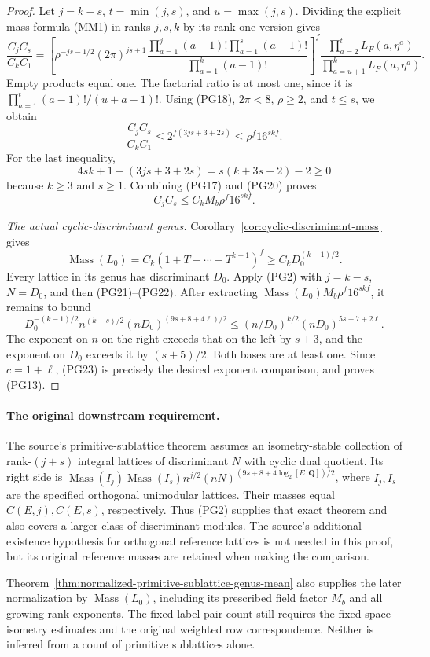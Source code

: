 \begin{proof}
Let \(j=k-s\), \(t=\min(j,s)\), and \(u=\max(j,s)\).
Dividing the explicit mass formula (MM1) in ranks \(j,s,k\)
by its rank-one version gives
\[
 \frac{C_jC_s}{C_k C_1}
 =
 \left[
  \rho^{-js-1/2}(2\pi)^{js+1}
  \frac{\prod_{a=1}^{j}(a-1)!\prod_{a=1}^{s}(a-1)!}
       {\prod_{a=1}^{k}(a-1)!}
 \right]^f
 \frac{\prod_{a=2}^{t}L_F(a,\eta^a)}
      {\prod_{a=u+1}^{k}L_F(a,\eta^a)}.
 \tag{PG19}
\]
Empty products equal one.  The factorial ratio is at most
one, since it is
\(\prod_{a=1}^{t}(a-1)!/(u+a-1)!\).
Using (PG18), \(2\pi<8\), \(\rho\geq2\), and \(t\leq s\),
we obtain
\[
 \frac{C_jC_s}{C_k C_1}
       \leq 2^{f(3js+3+2s)}
       \leq \rho^f16^{skf}.
 \tag{PG20}
\]
For the last inequality,
\[
 4sk+1-(3js+3+2s)=s(k+3s-2)-2\geq0
\]
because \(k\geq3\) and \(s\geq1\).
Combining (PG17) and (PG20) proves
\[
                C_jC_s\leq C_kM_b\rho^f16^{skf}.
 \tag{PG21}
\]

\smallskip\noindent\emph{The actual cyclic-discriminant genus.}
Corollary~\ref{cor:cyclic-discriminant-mass} gives
\[
 \operatorname{Mass}(L_0)
   =C_k(1+T+\cdots+T^{k-1})^f
                  \geq C_kD_0^{(k-1)/2}.
 \tag{PG22}
\]
Every lattice in its genus has discriminant \(D_0\).
Apply (PG2) with \(j=k-s\), \(N=D_0\), and then
(PG21)--(PG22).  After extracting
\(\operatorname{Mass}(L_0)M_b\rho^f16^{skf}\), it remains
to bound
\[
 D_0^{-(k-1)/2}n^{(k-s)/2}
                       (nD_0)^{(9s+8+4\ell)/2}
 \leq (n/D_0)^{k/2}(nD_0)^{5s+7+2\ell}.
 \tag{PG23}
\]
The exponent on \(n\) on the right exceeds that on the
left by \(s+3\), and the exponent on \(D_0\) exceeds it
by \((s+5)/2\).  Both bases are at least one.  Since
\(c=1+\ell\), (PG23) is precisely the desired exponent
comparison, and proves (PG13).
\end{proof}

\paragraph{The original downstream requirement.}
The source's primitive-sublattice theorem assumes an
isometry-stable collection of rank-\((j+s)\) integral
lattices of discriminant \(N\) with cyclic dual quotient.
Its right side is
\(\operatorname{Mass}(I_j)\operatorname{Mass}(I_s)
 n^{j/2}(nN)^{(9s+8+4\log_2[E:\mathbf Q])/2}\),
where \(I_j,I_s\) are the specified orthogonal unimodular
lattices.  Their masses equal \(C(E,j),C(E,s)\), respectively.
Thus (PG2) supplies that exact theorem and also covers a
larger class of discriminant modules.  The source's
additional existence hypothesis for orthogonal reference
lattices is not needed in this proof, but its original
reference masses are retained when making the comparison.
\cite{primitive-sublattice-mean-source}

Theorem~\ref{thm:normalized-primitive-sublattice-genus-mean}
also supplies the later normalization by
\(\operatorname{Mass}(L_0)\), including its prescribed field
factor \(M_b\) and all growing-rank exponents.  The fixed-label
pair count still requires the fixed-space isometry estimates
and the original weighted row correspondence.  Neither is
inferred from a count of primitive sublattices alone.
